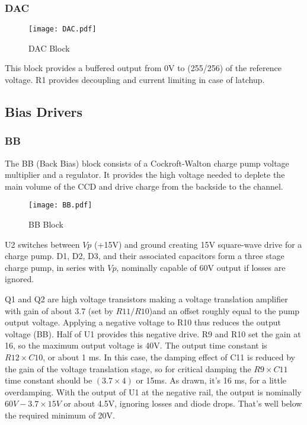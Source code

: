 \subsubsection{DAC}

   \begin{figure}
   \begin{center}
   \texttt{[image: DAC.pdf]}
   \end{center}
   \caption{DAC Block}
   \end{figure}
This block provides a buffered output from 0V to (255/256) of the reference voltage. R1 provides decoupling and current limiting in case of latchup.

\subsection{Bias Drivers}
\subsubsection{BB}

The BB (Back Bias) block consists of a Cockroft-Walton charge pump voltage multiplier and a regulator. It provides the high voltage needed to deplete the main volume of the CCD and drive charge from the backside to the channel.

   \begin{figure}
   \begin{center}
   \texttt{[image: BB.pdf]}
   \end{center}
   \caption{BB Block}
   \end{figure}

U2 switches between $Vp$ (+15V) and ground creating 15V square-wave drive for a charge pump. D1, D2, D3, and their associated capacitors form a three stage charge pump, in series with $Vp$, nominally capable of 60V output if losses are ignored. 

Q1 and Q2 are high voltage transistors making a voltage translation amplifier with gain of about 3.7 (set by $R11/R10$)and an offset roughly equal to the pump output voltage. Applying a negative voltage to R10 thus reduces the output voltage (BB). Half of U1 provides this negative drive. R9 and R10 set the gain at 16, so the maximum output voltage is 40V. The output time constant is $R12\times C10$, or about 1 ms. In this case, the damping effect of C11 is reduced by the gain of the voltage translation stage, so for critical damping the $R9\times C11$ time constant should be $(3.7\times4)$ or 15ms. As drawn, it's 16 ms, for a little overdamping. With the output of U1 at the negative rail, the output is nominally $60V-3.7\times15V$ or about 4.5V, ignoring losses and diode drops. That's well below the required minimum of 20V.

